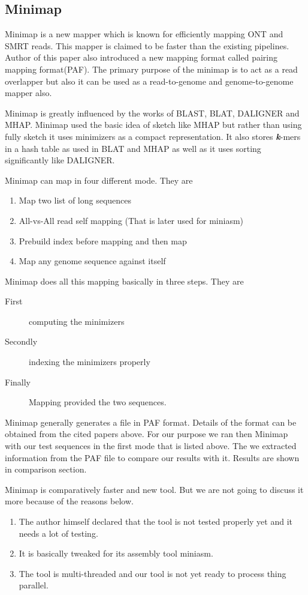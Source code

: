 \documentclass{standalone}
\begin{document}
\subsection{Minimap}
Minimap\cite{minimap} is a new mapper which is known for efficiently mapping ONT\cite{minimap} and SMRT\cite{minimap} reads. This mapper is claimed to be faster than the existing pipelines. Author of this paper also introduced a new mapping format called pairing mapping format(PAF)\cite{minimap}. The primary purpose of the minimap is to act as a read overlapper but also it can be used as a read-to-genome and genome-to-genome mapper also.
\par 
Minimap is greatly influenced  by the works of BLAST\cite{BLAST}, BLAT\cite{BLAT}, DALIGNER\cite{DALIGNER} and MHAP\cite{MHAP}. Minimap used the basic idea of sketch\cite{minimap} like  MHAP but rather than using fully sketch it uses minimizers as a compact representation. It also stores {\bf \emph{k}}-mers in a hash table as used in BLAT and MHAP as well as it uses sorting significantly like DALIGNER.
\par 
Minimap can map in four different mode. They are
\begin{enumerate}
	\item Map two list of long sequences
	\item All-vs-All read self mapping (That is later used for miniasm\cite{minimap})
	\item Prebuild index before mapping and then map
	\item Map any genome sequence against itself
\end{enumerate}
Minimap does all this mapping basically in three steps. They are
\begin{description}
	\item [First] computing the minimizers
	\item [Secondly] indexing the minimizers properly
	\item [Finally] Mapping provided the two sequences.
\end{description}
Minimap generally generates a file in PAF format. Details of the format can be obtained from the cited papers above. For our purpose we ran then Minimap with our test sequences in the first mode that is listed above. The we extracted information from the PAF file to compare our results with it. Results are shown in comparison section.

Minimap is comparatively faster and new tool. But we are not going to discuss it more because of the reasons below.

\begin{enumerate}
	\item The author himself declared that the tool is not tested properly yet and it needs a lot of testing.
	\item It is basically tweaked for its assembly tool miniasm\cite{minimap}.
	\item The tool is multi-threaded and our tool is not yet ready to process thing parallel.
\end{enumerate}
\end{document}
